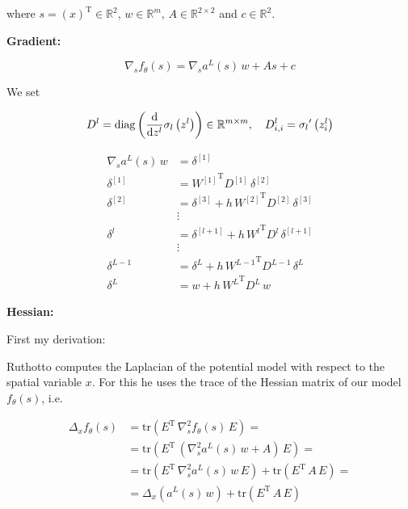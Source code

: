 where $s = \left(x\right)^{\mathrm{T}} \in \mathbb{R}^{2}$, $w \in \mathbb{R}^{m}$, $A \in \mathbb{R}^{2 \times 2}$ and $c \in \mathbb{R}^2$.

\textbf{Gradient:}

\begin{equation*}
    \nabla_s f_{\theta}\left(s\right) = \nabla_s a^{L}\left(s\right) \, w + A s + c
\end{equation*}

We set

\begin{equation*}
    D^{l} = \mathrm{diag} \left( \frac{\textup{d}}{\textup{d}z^{l}} \sigma_{l} \left(z^{l}\right) \right) \in \mathbb{R}^{m \times m}, \quad D_{i, i}^{l} = {\sigma_{l}}^{\prime} \left(z_{i}^{l}\right)
\end{equation*}

\begin{align*}
    \nabla_s a^{L}\left(s\right) \, w & = \delta^{[1]}  \\
    \delta^{[1]} & = {W^{[1]}}^{\mathrm{T}} D^{[1]} \, \delta^{[2]} \\
    \delta^{[2]} & = \delta^{[3]} + h \, {W^{[2]}}^{\mathrm{T}} D^{[2]} \, \delta^{[3]} \\
    &\vdots\\
    \delta^{l} & = \delta^{[l+1]} + h \, {W^{l}}^{\mathrm{T}} D^{l} \, \delta^{[l+1]} \\
    &\vdots\\
    \delta^{L-1} & = \delta^{L} + h \, {W^{L-1}}^{\mathrm{T}} D^{L-1} \, \delta^{L} \\
    \delta^{L} & = w + h \, {W^{L}}^{\mathrm{T}} D^{L} \, w
\end{align*}


\textbf{Hessian:}

First my derivation:

Ruthotto computes the Laplacian of the potential model with respect to the spatial variable $x$. For this he uses the trace of the Hessian matrix of our model $f_{\theta}\left(s\right)$, i.e. 

\begin{align*}
    \Delta_x f_{\theta}\left(s\right) & = \mathrm{tr}\left(E^{\mathrm{T}} \, \nabla^{2}_s f_{\theta}\left(s\right) \, E\right) = \\
    & = \mathrm{tr}\left(E^{\mathrm{T}} \, \left(\nabla^{2}_s a^{L}\left(s\right) \, w + A\right) \, E\right) = \\
    & = \mathrm{tr}\left(E^{\mathrm{T}} \, \nabla^{2}_s a^{L}\left(s\right) \, w \, E\right) + \mathrm{tr}\left(E^{\mathrm{T}} \,  A \, E\right) = \\
    & = \Delta_x \left(a^{L}\left(s\right) \, w\right) + \mathrm{tr}\left(E^{\mathrm{T}} \,  A \, E\right)
\end{align*}

